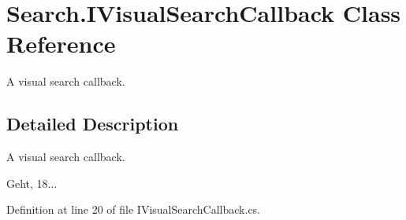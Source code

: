 \section{Search.\-I\-Visual\-Search\-Callback Class Reference}
\label{class_search_1_1_i_visual_search_callback}


A visual search callback.  




\subsection{Detailed Description}
A visual search callback. 

Geht, 18... 

Definition at line 20 of file I\-Visual\-Search\-Callback.\-cs.

